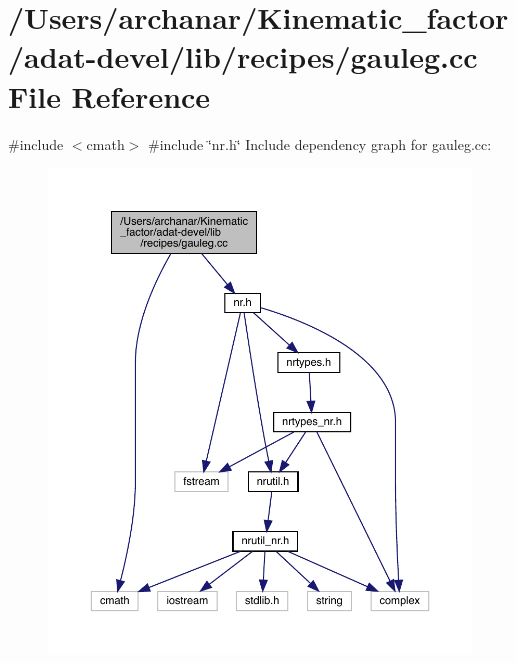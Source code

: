 \hypertarget{adat-devel_2lib_2recipes_2gauleg_8cc}{}\section{/\+Users/archanar/\+Kinematic\+\_\+factor/adat-\/devel/lib/recipes/gauleg.cc File Reference}
\label{adat-devel_2lib_2recipes_2gauleg_8cc}
{\ttfamily \#include $<$cmath$>$}\newline
{\ttfamily \#include \char`\"{}nr.\+h\char`\"{}}\newline
Include dependency graph for gauleg.\+cc\+:
\nopagebreak
\begin{figure}[H]
\begin{center}
\leavevmode
\includegraphics[width=350pt]{d7/dda/adat-devel_2lib_2recipes_2gauleg_8cc__incl}
\end{center}
\end{figure}
